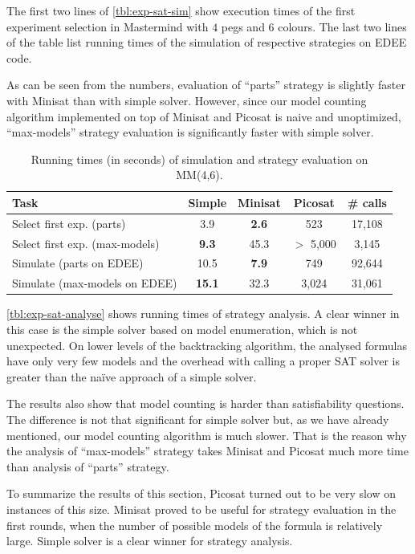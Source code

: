The first two lines of \autoref{tbl:exp-sat-sim} show execution times of the
  first experiment selection in Mastermind with $4$ pegs and $6$ colours.
The last two lines of the table list running times of the simulation of
  respective strategies on EDEE code.

As can be seen from the numbers, evaluation of ``parts'' strategy is slightly
  faster with Minisat than with simple solver.
However, since our model counting algorithm implemented on top of Minisat and Picosat
  is naive and unoptimized, ``max-models'' strategy evaluation is significantly faster
  with simple solver.

\begin{table}[h]
\begin{center}
\begin{tabular}{|l|c|c|c|c|} \hline
Task & Simple & Minisat & Picosat & \# calls \\ \hline
Select first exp. (parts) & 3.9 & \textbf{2.6} & 523 & 17,108 \\
Select first exp. (max-models) & \textbf{9.3} & 45.3 & $>$ 5,000 & 3,145 \\
Simulate (parts on EDEE) & 10.5 & \textbf{7.9} & 749 & 92,644 \\
Simulate (max-models on EDEE) & \textbf{15.1} & 32.3 & 3,024 & 31,061 \\\hline
\end{tabular}
\caption{Running times (in seconds) of simulation and strategy evaluation on MM(4,6).}
\label{tbl:exp-sat-sim}
\end{center}
\end{table}

\autoref{tbl:exp-sat-analyse}
  shows running times of strategy analysis.
A clear winner in this case is the simple solver based on
  model enumeration,
  which is not unexpected.
On lower levels of the backtracking algorithm,
  the analysed formulas have only very few models and the
  overhead with calling a proper SAT solver is greater
  than the na\"ive approach of a simple solver.

The results also show that model counting is harder than satisfiability questions.
The difference is not that significant for simple solver
 but, as we have already mentioned, our model counting algorithm is much slower.
That is the reason why the analysis of ``max-models'' strategy takes Minisat and Picosat
  much more time than analysis of ``parts'' strategy.

To summarize the results of this section,
Picosat turned out to be very slow on instances of this size. Minisat proved to be
useful for strategy evaluation in the first rounds, when the number of possible
models of the formula is relatively large.
Simple solver is a clear winner for strategy analysis.

